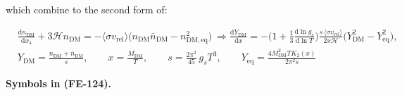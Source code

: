 \documentclass[
  10pt,
]{article}
\begin{document}
which combine to the second form of:

\[
\begin{aligned}
&\frac{\mathrm{d}n_{\mathrm{DM}}}{\mathrm{d}x_4} + 3\mathcal{H}n_{\mathrm{DM}}
 = -\langle\sigma v_{\mathrm{rel}}\rangle\big(n_{\mathrm{DM}}\bar n_{\mathrm{DM}} -
 n_{\mathrm{DM,eq}}^2\big)\ \Rightarrow
 \frac{\mathrm{d}Y_{\mathrm{DM}}}{\mathrm{d}x} = -\Big(1 + \frac13\frac{\mathrm{d}\ln g_s}{\mathrm{d}\ln
 T}\Big)
 \frac{s\,\langle\sigma v_{\mathrm{rel}}\rangle}{2x\mathcal{H}}\big(Y_{\mathrm{DM}}^2 -
 Y_{\mathrm{eq}}^2\big),\\
&Y_{\mathrm{DM}} = \frac{n_{\mathrm{DM}} + \bar n_{\mathrm{DM}}}{s},\qquad x =
 \frac{M_{\mathrm{DM}}}{T},\qquad
 s = \frac{2\pi^2}{45}\,g_sT^3,\qquad Y_{\mathrm{eq}} = \frac{4M_{\mathrm{DM}}^2TK_2(x)}{2\pi^2s}
\end{aligned} \tag{FE-124}
\]

\textbf{Symbols in (FE-124).}
\end{document}
